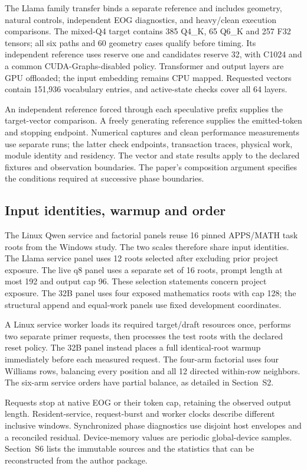 The Llama family transfer binds a separate reference and includes geometry, natural controls, independent EOG diagnostics, and heavy/clean execution comparisons. The mixed-Q4 target contains 385 Q4\_K, 65 Q6\_K and 257 F32 tensors; all six paths and 60 geometry cases qualify before timing. Its independent reference uses reserve one and candidates reserve 32, with C1024 and a common CUDA-Graphs-disabled policy. Transformer and output layers are GPU offloaded; the input embedding remains CPU mapped. Requested vectors contain 151,936 vocabulary entries, and active-state checks cover all 64 layers.

An independent reference forced through each speculative prefix supplies the target-vector comparison. A freely generating reference supplies the emitted-token and stopping endpoint. Numerical captures and clean performance measurements use separate runs; the latter check endpoints, transaction traces, physical work, module identity and residency. The vector and state results apply to the declared fixtures and observation boundaries. The paper's composition argument specifies the conditions required at successive phase boundaries.

\subsection{Input identities, warmup and order}
The Linux Qwen service and factorial panels reuse 16 pinned APPS/MATH task roots from the Windows study. The two scales therefore share input identities. The Llama service panel uses 12 roots selected after excluding prior project exposure. The live q8 panel uses a separate set of 16 roots, prompt length at most 192 and output cap 96. These selection statements concern project exposure. The 32B panel uses four exposed mathematics roots with cap 128; the structural append and equal-work panels use fixed development coordinates.

A Linux service worker loads its required target/draft resources once, performs two separate primer requests, then processes the test roots with the declared reset policy. The 32B panel instead places a full identical-root warmup immediately before each measured request. The four-arm factorial uses four Williams rows, balancing every position and all 12 directed within-row neighbors. The six-arm service orders have partial balance, as detailed in Section~S2.

Requests stop at native EOG or their token cap, retaining the observed output length. Resident-service, request-burst and worker clocks describe different inclusive windows. Synchronized phase diagnostics use disjoint host envelopes and a reconciled residual. Device-memory values are periodic global-device samples. Section~S6 lists the immutable sources and the statistics that can be reconstructed from the author package.

